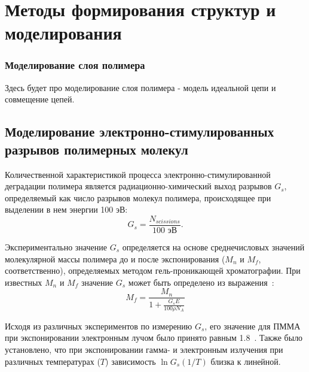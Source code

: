 \chapter{Методы формирования структур и моделирования} \label{chapter:methods}



%
%

\subsection{Моделирование слоя полимера}
Здесь будет про моделирование слоя полимера - модель идеальной цепи и совмещение цепей.


\section{Моделирование электронно-стимулированных разрывов полимерных молекул}
Количественной характеристикой процесса электронно-стимулированной деградации полимера является радиационно-химический выход разрывов $G_s$, определяемый как число разрывов молекул полимера, происходящее при выделении в нем энергии 100 эВ:
\begin{equation}
	G_s = \frac{N_{scissions}}{100 \text{ эВ}}.
\end{equation}

Экспериментально значение $G_s$ определяется на основе среднечисловых значений молекулярной массы полимера до и после экспонирования ($M_n$ и $M_f$, соответственно), определяемых методом гель-проникающей хроматографии. При известных $M_n$ и $M_f$ значение $G_s$ может быть определено из выражения~\cite{Greeneich1979_Mf_Mn}:
\begin{equation}
	{M_f = \frac{\displaystyle M_n}{1 + \frac{\displaystyle G_s E}{\displaystyle 100 \rho N_A}}}
\end{equation}

Исходя из различных экспериментов по измерению $G_s$, его значение для ПММА при экспонировании электронным лучом было принято равным 1.8~\cite{Charlesby_1964_Gs}. Также было установлено, что при экспонировании гамма- и электронным излучения при различных температурах ($T$) зависимость $\ln G_s (1/T)$ близка к линейной.


